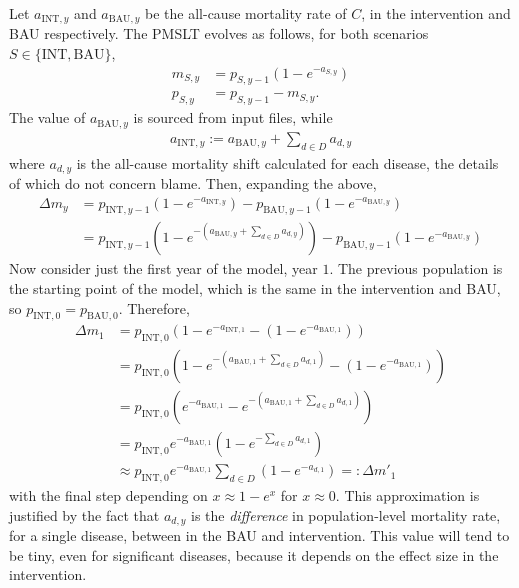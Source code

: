 \documentclass[]{article}
\begin{document}
Let $a_{\text{INT}, y}$ and $a_{\text{BAU}, y}$ be the all-cause mortality rate of $C$, in the intervention and BAU respectively. The PMSLT evolves as follows, for both scenarios $S \in \{\text{INT}, \text{BAU}\}$,
\begin{align*}
	m_{S, y} &= p_{S, y - 1} \left(1 - e^{-a_{S, y}}\right) \\
	p_{S, y} &= p_{S, y - 1} - m_{S, y}.
\end{align*}
The value of $a_{\text{BAU}, y}$ is sourced from input files, while
\begin{align*}
	a_{\text{INT}, y} := a_{\text{BAU}, y} + \sum_{d \in D} a_{d, y}
\end{align*}
where $a_{d, y}$ is the all-cause mortality shift calculated for each disease, the details of which do not concern blame. Then, expanding the above,
\begin{align*}
	\Delta m_y &= p_{\text{INT}, y - 1} \left(1 - e^{-a_{\text{INT}, y}}\right) - p_{\text{BAU}, y - 1} \left(1 - e^{-a_{\text{BAU}, y}}\right) \\
	&= p_{\text{INT}, y - 1} \left(1 - e^{-(a_{\text{BAU}, y} + \sum_{d \in D} a_{d, y})}\right) - p_{\text{BAU}, y - 1} \left(1 - e^{-a_{\text{BAU}, y}}\right)
\end{align*}
Now consider just the first year of the model, year $1$. The previous population is the starting point of the model, which is the same in the intervention and BAU, so $p_{\text{INT}, 0} = p_{\text{BAU}, 0}$. Therefore,
\begin{align*}
	\Delta m_1 &= p_{\text{INT}, 0} \left(1 - e^{-a_{\text{INT}, 1}} - \left(1 - e^{-a_{\text{BAU}, 1}}\right)\right) \\
	&= p_{\text{INT}, 0} \left(1 - e^{-(a_{\text{BAU}, 1} + \sum_{d \in D} a_{d, 1})} - \left(1 - e^{-a_{\text{BAU}, 1}}\right)\right) \\
	&= p_{\text{INT}, 0} \left(e^{-a_{\text{BAU}, 1}} - e^{-(a_{\text{BAU}, 1} + \sum_{d \in D} a_{d, 1})}\right) \\
	&= p_{\text{INT}, 0} e^{-a_{\text{BAU}, 1}} \left(1 - e^{-\sum_{d \in D} a_{d, 1}}\right) \\
	&\approx p_{\text{INT}, 0} e^{-a_{\text{BAU}, 1}} \sum_{d \in D} \left(1 - e^{-a_{d, 1}}\right) =: \Delta m'_1
\end{align*}
with the final step depending on $x \approx 1 - e^x$ for $x \approx 0$. This approximation is justified by the fact that $a_{d,y}$ is the \textit{difference} in population-level mortality rate, for a single disease, between in the BAU and intervention. This value will tend to be tiny, even for significant diseases, because it depends on the effect size in the intervention.
\end{document}
